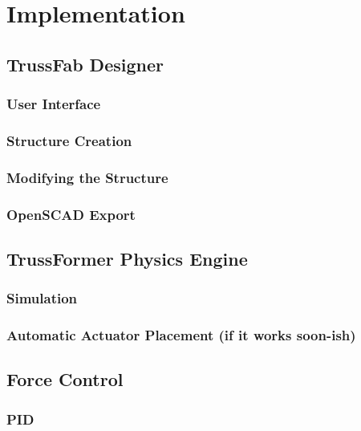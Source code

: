 \chapter{Implementation}\label{ch:implementation}
\section{TrussFab Designer}
\subsection{User Interface}
\subsection{Structure Creation}
\subsection{Modifying the Structure}
\subsection{OpenSCAD Export}
\clearpage
\section{TrussFormer Physics Engine}
\subsection{Simulation}
\subsection{Automatic Actuator Placement (if it works soon-ish)}
\clearpage
\section{Force Control}
\subsection{PID}
